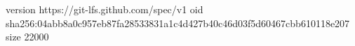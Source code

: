 version https://git-lfs.github.com/spec/v1
oid sha256:04abb8a0c957eb87fa28533831a1c4d427b40c46d03f5d60467cbb610118e207
size 22000
